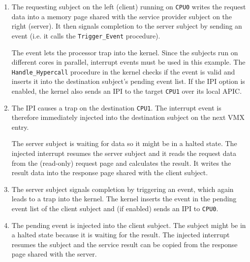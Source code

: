 \begin{enumerate}
	\item The requesting subject on the left (client) running on \texttt{CPU0}
		writes the request data into a memory page shared with the service
		provider subject on the right (server). It then signals completion to
		the server subject by sending an event (i.e.  it calls the
		\texttt{Trigger\_Event} procedure).

		The event lets the processor trap into the kernel. Since the subjects
		run on different cores in parallel, interrupt events must be used in
		this example. The \texttt{Handle\_Hypercall} procedure in the kernel
		checks if the event is valid and inserts it into the destination
		subject's pending event list. If the IPI option is enabled, the kernel
		also sends an IPI to the target \texttt{CPU1} over its local APIC.
	\item The IPI causes a trap on the destination \texttt{CPU1}. The interrupt
		event is therefore immediately injected into the destination subject on
		the next VMX entry.

		The server subject is waiting for data so it might be in a halted state.
		The injected interrupt resumes the server subject and it reads the
		request data from the (read-only) request page and calculates the
		result. It writes the result data into the response page shared with the
		client subject.
	\item The server subject signals completion by triggering an event, which
		again leads to a trap into the kernel. The kernel inserts the event in
		the pending event list of the client subject and (if enabled) sends an
		IPI to \texttt{CPU0}.
	\item The pending event is injected into the client subject. The subject
		might be in a halted state because it is waiting for the result. The
		injected interrupt resumes the subject and the service result can be
		copied from the response page shared with the server.
\end{enumerate}
